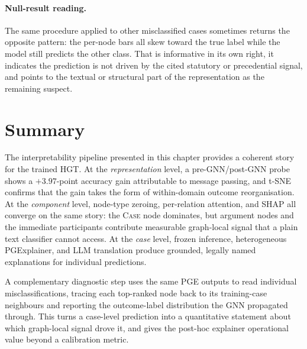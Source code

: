 \paragraph{Null-result reading.}
The same procedure applied to other misclassified cases sometimes
returns the opposite pattern: the per-node bars all skew toward the
true label while the model still predicts the other class. That is
informative in its own right, it indicates the prediction is not
driven by the cited statutory or precedential signal, and points to
the textual or structural part of the representation as the remaining
suspect.

\section{Summary}

The interpretability pipeline presented in this chapter provides a
coherent story for the trained HGT. At the \emph{representation}
level, a pre-GNN/post-GNN probe shows a
$+3.97$-point accuracy gain attributable to message passing, and
t-SNE confirms that the gain takes the form of within-domain outcome
reorganisation. At the \emph{component} level, node-type zeroing,
per-relation attention, and SHAP all converge on the same story: the
\textsc{Case} node dominates, but argument nodes and the immediate
participants contribute measurable graph-local signal that a plain
text classifier cannot access. At the \emph{case} level, frozen
inference, heterogeneous PGExplainer, and LLM translation produce
grounded, legally named explanations for individual predictions.

A complementary diagnostic step uses the same PGE outputs to read
individual misclassifications, tracing each top-ranked node back to its
training-case neighbours and reporting the outcome-label distribution
the GNN propagated through. This turns a case-level prediction into a
quantitative statement about which graph-local signal drove it, and
gives the post-hoc explainer operational value beyond a calibration
metric.
